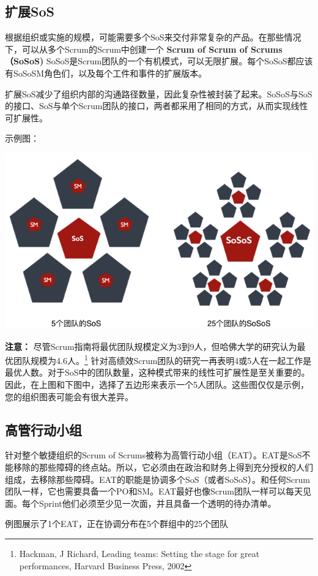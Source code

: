 \documentclass[12pt,a4paper,parskip=full]{scrartcl}
\begin{document}
\begin{CJK*}{UTF8}{gbsn}
\subsection{扩展SoS}
根据组织或实施的规模，可能需要多个SoS来交付非常复杂的产品。在那些情况下，可以从多个Scrum的Scrum中创建一个
\textbf{Scrum of Scrum of Scrums（SoSoS)} SoSoS是Scrum团队的一个有机模式，可以无限扩展。每个SoSoS都应该有SoSoSM角色们，以及每个工件和事件的扩展版本。

扩展SoS减少了组织内部的沟通路径数量，因此复杂性被封装了起来。SoSoS与SoS的接口、SoS与单个Scrum团队的接口，两者都采用了相同的方式，从而实现线性可扩展性。

\pagebreak
示例图：

\includegraphics[width=1.0\linewidth]{Sos-R2.png}

\textbf{\textsc{注意：}} 尽管Scrum指南将最优团队规模定义为3到9人，但哈佛大学的研究认为最优团队规模为4.6人。\footnote{Hackman, J Richard, Leading teams: Setting the stage for
great performances, Harvard Business Press, 2002} 针对高绩效Scrum团队的研究一再表明4或5人在一起工作是最优人数。对于SoS中的团队数量，这种模式带来的线性可扩展性是至关重要的。因此，在上图和下图中，选择了五边形来表示一个5人团队。这些图仅仅是示例，您的组织图表可能会有很大差异。
\subsection{高管行动小组}
针对整个敏捷组织的Scrum of Scrums被称为高管行动小组（EAT）。EAT是SoS不能移除的那些障碍的终点站。所以，它必须由在政治和财务上得到充分授权的人们组成，去移除那些障碍。EAT的职能是协调多个SoS（或者SoSoS）。和任何Scrum团队一样，它也需要具备一个PO和SM。EAT最好也像Scrum团队一样可以每天见面。每个Sprint他们必须至少见一次面，并且具备一个透明的待办清单。

\pagebreak
例图展示了1个EAT，正在协调分布在5个群组中的25个团队


\end{CJK*}
\end{document}
